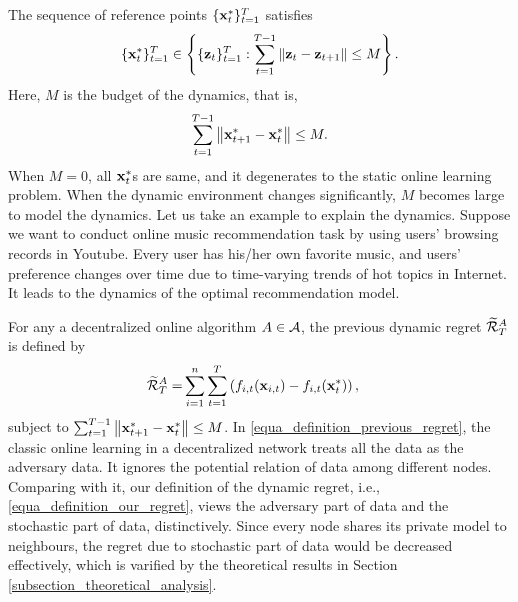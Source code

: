 \documentclass{article}
\begin{document}
The sequence of reference points $\{{\bf x}_t^\ast\}_{t=1}^T$ satisfies 
\begin{align}
\nonumber
\{{\bf x}_t^\ast\}_{t=1}^T \in \left\{ \{{\bf z}_t\}_{t=1}^{T} : \sum_{t=1}^{T-1} \left\lVert{\bf z}_t - {\bf z}_{t+1}\right\rVert \le M \right\}.
\end{align} Here, $M$ is the budget of the dynamics, that is,
\begin{align}
\label{equa_define_M}
\sum_{t=1}^{T-1} \left\lVert{\bf x}_{t+1}^\ast - {\bf x}_t^\ast\right\rVert \le M.
\end{align} When $M=0$, all ${\bf x}_t^\ast$s are same, and it degenerates to the static online learning problem. When the dynamic environment changes significantly, $M$ becomes large to model the dynamics. Let us take an example to explain the dynamics. Suppose we want to conduct online music recommendation task by using users' browsing records in Youtube. Every user has his/her own favorite music, and users' preference  changes over time due to time-varying trends of hot topics in Internet. It leads to the dynamics of the optimal recommendation model.  


For any a decentralized online algorithm $A \in {\mathcal{A}}$, the previous dynamic regret  $\widetilde{{\mathcal{R}}}_T^{A}$ is defined by
\begin{align}
\label{equa_definition_previous_regret}
\widetilde{{\mathcal{R}}}_T^{A} = &  \sum_{i=1}^n\sum_{t=1}^T \left(  f_{i,t}({\bf x}_{i,t}) - f_{i,t}({\bf x}_t^\ast)  \right),
\end{align} subject to $\sum_{t=1}^{T-1} \left\lVert{\bf x}_{t+1}^\ast - {\bf x}_t^\ast\right\rVert \le M$.  In \eqref{equa_definition_previous_regret}, the classic online learning in a decentralized network treats all the data as the adversary data. It ignores the potential relation of data among different nodes. Comparing with it, our definition of the dynamic regret, i.e., \eqref{equa_definition_our_regret}, views the adversary part of data and the stochastic part of data, distinctively.  Since every node shares its private model to neighbours, the regret due to stochastic part of data would be decreased effectively, which is varified by the theoretical results in Section \ref{subsection_theoretical_analysis}.
\end{document}
